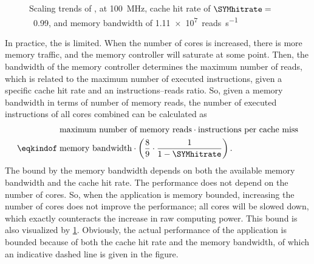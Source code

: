 \begin{figure}%
%
\caption{Scaling trends of \Starburst*, at \SI{100}{\mega\hertz}, cache hit rate of $\SYMhitrate=$~\num{.99}, and memory bandwidth of \SI{1.11e7}{reads\per\second}}%
\label{fig:hardware:performance_complexity}%
\end{figure}

In practice, the  is limited.
When the number of cores is increased, there is more memory traffic, and the memory controller will saturate at some point.
Then, the bandwidth of the memory controller determines the maximum number of reads, which is related to the maximum number of executed instructions, given a specific cache hit rate and an instructions--reads ratio.
So, given a memory bandwidth in terms of number of memory reads, the number of executed instructions of all cores combined can be calculated as
\begin{align*}
			& \text{maximum number of memory reads} \cdot \text{instructions per cache miss}			\\
\eqkindof\;	& \text{memory bandwidth} \cdot \left(\frac{8}{9}\cdot\frac{1}{1-\SYMhitrate}\right).	
\end{align*}
The bound by the memory bandwidth depends on both the available memory bandwidth and the cache hit rate.
The performance does not depend on the number of cores.
So, when the application is memory bounded, increasing the number of cores does not improve the performance; all cores will be slowed down, which exactly counteracts the increase in raw computing power.
This bound is also visualized by \cref{fig:hardware:performance_complexity}.
Obviously, the actual performance of the application is bounded because of both the cache hit rate and the memory bandwidth, of which an indicative dashed line is given in the figure.


